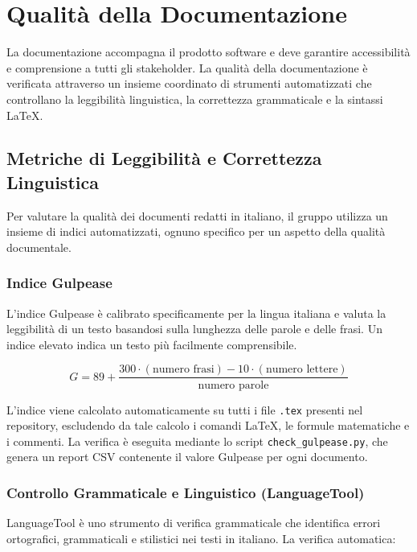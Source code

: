 \documentclass[a4paper,11pt,oneside]{scrartcl}
\begin{document}
\section{Qualità della Documentazione}

La documentazione accompagna il prodotto software e deve garantire accessibilità e comprensione a tutti gli stakeholder{\scriptsize{}}. La qualità della documentazione è verificata attraverso un insieme coordinato di strumenti automatizzati che controllano la leggibilità linguistica, la correttezza grammaticale e la sintassi \LaTeX.

\subsection{Metriche di Leggibilità e Correttezza Linguistica}

Per valutare la qualità dei documenti redatti in italiano, il gruppo utilizza un insieme di indici automatizzati, ognuno specifico per un aspetto della qualità documentale.

\subsubsection{Indice Gulpease}

L'indice Gulpease{\scriptsize{}} è calibrato specificamente per la lingua italiana e valuta la leggibilità di un testo basandosi sulla lunghezza delle parole e delle frasi. Un indice elevato indica un testo più facilmente comprensibile.

\[
G = 89 + \frac{300 \cdot (\text{numero frasi}) - 10 \cdot (\text{numero lettere})}{\text{numero parole}}
\]

L'indice viene calcolato automaticamente su tutti i file \texttt{.tex} presenti nel repository{\scriptsize{}}, escludendo da tale calcolo i comandi \LaTeX{}{\scriptsize{}}, le formule matematiche e i commenti. La verifica è eseguita mediante lo script \texttt{check\_gulpease.py}, che genera un report CSV contenente il valore Gulpease per ogni documento.

\subsubsection{Controllo Grammaticale e Linguistico (LanguageTool)}

LanguageTool è uno strumento di verifica grammaticale che identifica errori ortografici, grammaticali e stilistici nei testi in italiano. La verifica automatica:
\end{document}
